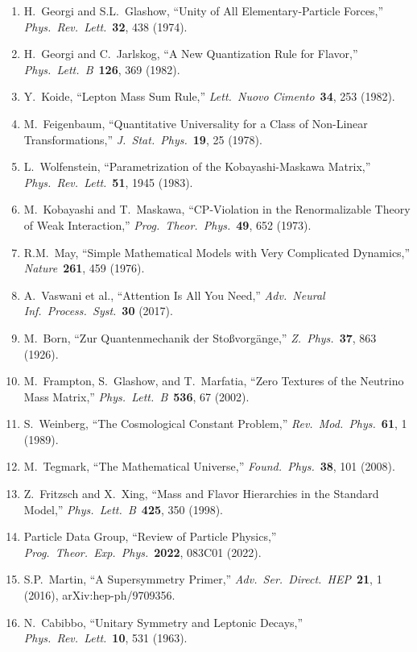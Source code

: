 \documentclass[11pt,a4paper]{article}
\begin{document}
\begin{enumerate}
\item H.~Georgi and S.L.~Glashow, ``Unity of All Elementary-Particle Forces,'' \textit{Phys.\ Rev.\ Lett.}\ \textbf{32}, 438 (1974).
\item H.~Georgi and C.~Jarlskog, ``A New Quantization Rule for Flavor,'' \textit{Phys.\ Lett.\ B}\ \textbf{126}, 369 (1982).
\item Y.~Koide, ``Lepton Mass Sum Rule,'' \textit{Lett.\ Nuovo Cimento}\ \textbf{34}, 253 (1982).
\item M.~Feigenbaum, ``Quantitative Universality for a Class of Non-Linear Transformations,'' \textit{J.\ Stat.\ Phys.}\ \textbf{19}, 25 (1978).
\item L.~Wolfenstein, ``Parametrization of the Kobayashi-Maskawa Matrix,'' \textit{Phys.\ Rev.\ Lett.}\ \textbf{51}, 1945 (1983).
\item M.~Kobayashi and T.~Maskawa, ``CP-Violation in the Renormalizable Theory of Weak Interaction,'' \textit{Prog.\ Theor.\ Phys.}\ \textbf{49}, 652 (1973).
\item R.M.~May, ``Simple Mathematical Models with Very Complicated Dynamics,'' \textit{Nature}\ \textbf{261}, 459 (1976).
\item A.~Vaswani et al., ``Attention Is All You Need,'' \textit{Adv.\ Neural Inf.\ Process.\ Syst.}\ \textbf{30} (2017).
\item M.~Born, ``Zur Quantenmechanik der Stoßvorgänge,'' \textit{Z.\ Phys.}\ \textbf{37}, 863 (1926).
\item M.~Frampton, S.~Glashow, and T.~Marfatia, ``Zero Textures of the Neutrino Mass Matrix,'' \textit{Phys.\ Lett.\ B}\ \textbf{536}, 67 (2002).
\item S.~Weinberg, ``The Cosmological Constant Problem,'' \textit{Rev.\ Mod.\ Phys.}\ \textbf{61}, 1 (1989).
\item M.~Tegmark, ``The Mathematical Universe,'' \textit{Found.\ Phys.}\ \textbf{38}, 101 (2008).
\item Z.~Fritzsch and X.~Xing, ``Mass and Flavor Hierarchies in the Standard Model,'' \textit{Phys.\ Lett.\ B}\ \textbf{425}, 350 (1998).
\item Particle Data Group, ``Review of Particle Physics,'' \textit{Prog.\ Theor.\ Exp.\ Phys.}\ \textbf{2022}, 083C01 (2022).
\item S.P.~Martin, ``A Supersymmetry Primer,'' \textit{Adv.\ Ser.\ Direct.\ HEP}\ \textbf{21}, 1 (2016), arXiv:hep-ph/9709356.
\item N.~Cabibbo, ``Unitary Symmetry and Leptonic Decays,'' \textit{Phys.\ Rev.\ Lett.}\ \textbf{10}, 531 (1963).

\end{enumerate}
\end{document}
